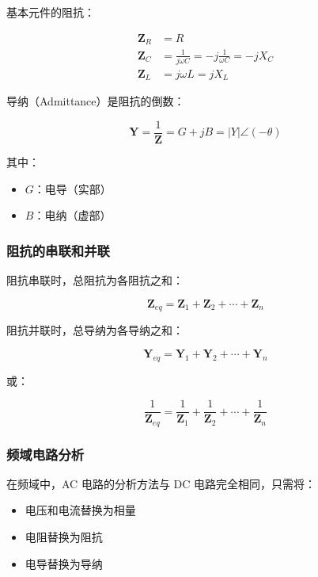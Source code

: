 基本元件的阻抗：

\begin{align}
\mathbf{Z}_R &= R \label{eq:resistor-impedance} \\
\mathbf{Z}_C &= \frac{1}{j\omega C} = -j \frac{1}{\omega C} = -j X_C \label{eq:capacitor-impedance} \\
\mathbf{Z}_L &= j\omega L = j X_L \label{eq:inductor-impedance}
\end{align}

导纳（Admittance）是阻抗的倒数：

\begin{equation}
\mathbf{Y} = \frac{1}{\mathbf{Z}} = G + jB = |Y| \angle (-\theta) \label{eq:admittance}
\end{equation}

其中：
\begin{itemize}
  \item $G$：电导（实部）
  \item $B$：电纳（虚部）
\end{itemize}

\subsubsection{阻抗的串联和并联}

阻抗串联时，总阻抗为各阻抗之和：

\begin{equation}
\mathbf{Z}_{eq} = \mathbf{Z}_1 + \mathbf{Z}_2 + \cdots + \mathbf{Z}_n \label{eq:impedance-series}
\end{equation}

阻抗并联时，总导纳为各导纳之和：

\begin{equation}
\mathbf{Y}_{eq} = \mathbf{Y}_1 + \mathbf{Y}_2 + \cdots + \mathbf{Y}_n \label{eq:admittance-parallel}
\end{equation}

或：

\begin{equation}
\frac{1}{\mathbf{Z}_{eq}} = \frac{1}{\mathbf{Z}_1} + \frac{1}{\mathbf{Z}_2} + \cdots + \frac{1}{\mathbf{Z}_n} \label{eq:impedance-parallel}
\end{equation}

\subsubsection{频域电路分析}

在频域中，AC 电路的分析方法与 DC 电路完全相同，只需将：
\begin{itemize}
  \item 电压和电流替换为相量
  \item 电阻替换为阻抗
  \item 电导替换为导纳
\end{itemize}

